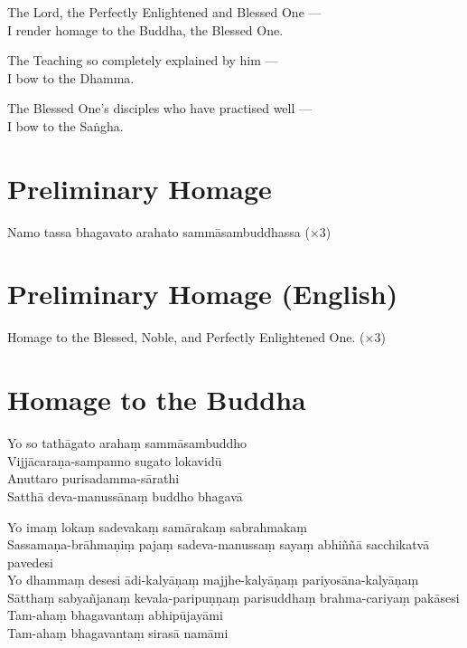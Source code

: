 The Lord, the Perfectly Enlightened and Blessed One ---\\
I render homage to the Buddha, the Blessed One.

The Teaching so completely explained by him ---\\
I bow to the Dhamma.

The Blessed One's disciples who have practised well ---\\
I bow to the Saṅgha.

\section*{Preliminary Homage}

\begin{leader}
\end{leader}

Namo tassa bhagavato arahato sammāsambuddhassa (×3)

\section*{Preliminary Homage (English)}

\begin{leader}
\end{leader}

Homage to the Blessed, Noble, and Perfectly Enlightened One. (×3)

\clearpage

\section*{Homage to the Buddha}

\begin{leader}
\end{leader}

Yo so tathāgato arahaṃ sammāsambuddho\\
Vijjācaraṇa-sampanno sugato lokavidū\\
Anuttaro purisadamma-sārathi\\
Satthā deva-manussānaṃ buddho bhagavā

Yo imaṃ lokaṃ sadevakaṃ samārakaṃ sabrahmakaṃ\\
Sassamaṇa-brāhmaṇiṃ pajaṃ sadeva-manussaṃ sayaṃ abhiññā sacchikatvā pavedesi\\
Yo dhammaṃ desesi ādi-kalyāṇaṃ majjhe-kalyāṇaṃ pariyosāna-kalyāṇaṃ\\
Sātthaṃ sabyañjanaṃ kevala-paripuṇṇaṃ parisuddhaṃ brahma-cariyaṃ pakāsesi\\
Tam-ahaṃ bhagavantaṃ abhipūjayāmi\\
Tam-ahaṃ bhagavantaṃ sirasā namāmi

